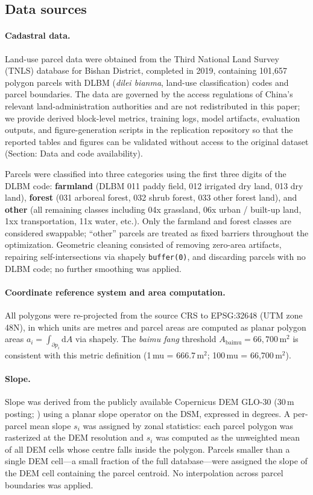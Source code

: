 \documentclass[preprint,12pt]{elsarticle}
\begin{document}
\subsection{Data sources}

\paragraph{Cadastral data.} Land-use parcel data were obtained from the Third National Land Survey (TNLS) database for Bishan District, completed in 2019, containing 101{,}657 polygon parcels with DLBM (\textit{dilei bianma}, land-use classification) codes and parcel boundaries. The data are governed by the access regulations of China's relevant land-administration authorities and are not redistributed in this paper; we provide derived block-level metrics, training logs, model artifacts, evaluation outputs, and figure-generation scripts in the replication repository so that the reported tables and figures can be validated without access to the original dataset (Section: Data and code availability).

Parcels were classified into three categories using the first three digits of the DLBM code: \textbf{farmland} (DLBM 011 paddy field, 012 irrigated dry land, 013 dry land), \textbf{forest} (031 arboreal forest, 032 shrub forest, 033 other forest land), and \textbf{other} (all remaining classes including 04x grassland, 06x urban / built-up land, 1xx transportation, 11x water, etc.). Only the farmland and forest classes are considered swappable; ``other'' parcels are treated as fixed barriers throughout the optimization. Geometric cleaning consisted of removing zero-area artifacts, repairing self-intersections via shapely \texttt{buffer(0)}, and discarding parcels with no DLBM code; no further smoothing was applied.

\paragraph{Coordinate reference system and area computation.} All polygons were re-projected from the source CRS to EPSG:32648 (UTM zone 48N), in which units are metres and parcel areas are computed as planar polygon areas $a_i = \int_{\partial p_i} \mathrm{d}A$ via shapely. The \textit{baimu fang} threshold $A_{\text{baimu}} = 66{,}700\,\text{m}^2$ is consistent with this metric definition (1\,mu = 666.7\,m$^2$; 100\,mu = 66{,}700\,m$^2$).

\paragraph{Slope.} Slope was derived from the publicly available Copernicus DEM GLO-30 (30\,m posting; \citealt{copernicus2021dem}) using a planar slope operator on the DSM, expressed in degrees. A per-parcel mean slope $s_i$ was assigned by zonal statistics: each parcel polygon was rasterized at the DEM resolution and $s_i$ was computed as the unweighted mean of all DEM cells whose centre falls inside the polygon. Parcels smaller than a single DEM cell---a small fraction of the full database---were assigned the slope of the DEM cell containing the parcel centroid. No interpolation across parcel boundaries was applied.
\end{document}

